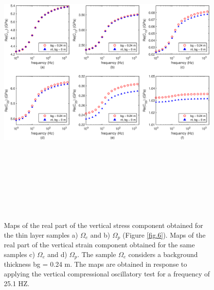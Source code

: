\documentclass[draft]{agujournal2019}
\begin{document}
\begin{figure}[!ht]
\centering
        \includegraphics[width= 140mm, height=160mm]{Figure8.eps}
\caption{Maps of the real part of the vertical stress component obtained for the thin layer samples a) $\Omega_e$  and b) $\Omega_p$ (Figure \ref{fig.6}). Maps of the real part of the vertical strain component obtained for the same samples c) $\Omega_e$  and d) $\Omega_p$. 
The sample $\Omega_e$ considers a background thickness bg = 0.24 m.
The maps are obtained in response to applying the vertical compressional oscillatory test for a frequency of 25.1 HZ.}
\label{fig.8}
\end{figure}
\end{document}
